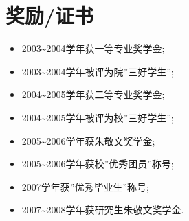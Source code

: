 \documentclass[a4paper,10pt,english]{manual}
\begin{document}
\section{奖励/证书}
\begin{itemize}
\item {} 
2003\textasciitilde{}2004学年获一等专业奖学金;

\item {} 
2003\textasciitilde{}2004学年被评为院''三好学生'';

\item {} 
2004\textasciitilde{}2005学年获二等专业奖学金;

\item {} 
2004\textasciitilde{}2005学年被评为校''三好学生'';

\item {} 
2005\textasciitilde{}2006学年获朱敬文奖学金;

\item {} 
2005\textasciitilde{}2006学年获校''优秀团员''称号;

\item {} 
2007学年获''优秀毕业生''称号;

\item {} 
2007\textasciitilde{}2008学年获研究生朱敬文奖学金.

\end{itemize}
\end{document}
